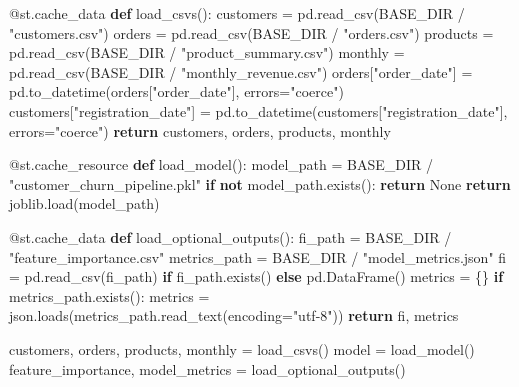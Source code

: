 \documentclass[
  indonesian,
  letterpaper,
  DIV=11,
  numbers=noendperiod]{scrreprt}
\newenvironment{Shaded}{\begin{snugshade}}{\end{snugshade}}
\newcommand{\AttributeTok}[1]{\textcolor[rgb]{0.40,0.45,0.13}{#1}}
\newcommand{\ControlFlowTok}[1]{\textcolor[rgb]{0.00,0.23,0.31}{\textbf{#1}}}
\newcommand{\KeywordTok}[1]{\textcolor[rgb]{0.00,0.23,0.31}{\textbf{#1}}}
\newcommand{\NormalTok}[1]{\textcolor[rgb]{0.00,0.23,0.31}{#1}}
\newcommand{\OperatorTok}[1]{\textcolor[rgb]{0.37,0.37,0.37}{#1}}
\newcommand{\StringTok}[1]{\textcolor[rgb]{0.13,0.47,0.30}{#1}}
\newcommand{\VariableTok}[1]{\textcolor[rgb]{0.07,0.07,0.07}{#1}}
\begin{document}
\begin{Shaded}
\begin{Highlighting}[]
\AttributeTok{@st.cache\_data}
\KeywordTok{def}\NormalTok{ load\_csvs():}
\NormalTok{    customers }\OperatorTok{=}\NormalTok{ pd.read\_csv(BASE\_DIR }\OperatorTok{/} \StringTok{"customers.csv"}\NormalTok{)}
\NormalTok{    orders }\OperatorTok{=}\NormalTok{ pd.read\_csv(BASE\_DIR }\OperatorTok{/} \StringTok{"orders.csv"}\NormalTok{)}
\NormalTok{    products }\OperatorTok{=}\NormalTok{ pd.read\_csv(BASE\_DIR }\OperatorTok{/} \StringTok{"product\_summary.csv"}\NormalTok{)}
\NormalTok{    monthly }\OperatorTok{=}\NormalTok{ pd.read\_csv(BASE\_DIR }\OperatorTok{/} \StringTok{"monthly\_revenue.csv"}\NormalTok{)}
\NormalTok{    orders[}\StringTok{"order\_date"}\NormalTok{] }\OperatorTok{=}\NormalTok{ pd.to\_datetime(orders[}\StringTok{"order\_date"}\NormalTok{], errors}\OperatorTok{=}\StringTok{"coerce"}\NormalTok{)}
\NormalTok{    customers[}\StringTok{"registration\_date"}\NormalTok{] }\OperatorTok{=}\NormalTok{ pd.to\_datetime(customers[}\StringTok{"registration\_date"}\NormalTok{], errors}\OperatorTok{=}\StringTok{"coerce"}\NormalTok{)}
    \ControlFlowTok{return}\NormalTok{ customers, orders, products, monthly}


\AttributeTok{@st.cache\_resource}
\KeywordTok{def}\NormalTok{ load\_model():}
\NormalTok{    model\_path }\OperatorTok{=}\NormalTok{ BASE\_DIR }\OperatorTok{/} \StringTok{"customer\_churn\_pipeline.pkl"}
    \ControlFlowTok{if} \KeywordTok{not}\NormalTok{ model\_path.exists():}
        \ControlFlowTok{return} \VariableTok{None}
    \ControlFlowTok{return}\NormalTok{ joblib.load(model\_path)}


\AttributeTok{@st.cache\_data}
\KeywordTok{def}\NormalTok{ load\_optional\_outputs():}
\NormalTok{    fi\_path }\OperatorTok{=}\NormalTok{ BASE\_DIR }\OperatorTok{/} \StringTok{"feature\_importance.csv"}
\NormalTok{    metrics\_path }\OperatorTok{=}\NormalTok{ BASE\_DIR }\OperatorTok{/} \StringTok{"model\_metrics.json"}
\NormalTok{    fi }\OperatorTok{=}\NormalTok{ pd.read\_csv(fi\_path) }\ControlFlowTok{if}\NormalTok{ fi\_path.exists() }\ControlFlowTok{else}\NormalTok{ pd.DataFrame()}
\NormalTok{    metrics }\OperatorTok{=}\NormalTok{ \{\}}
    \ControlFlowTok{if}\NormalTok{ metrics\_path.exists():}
\NormalTok{        metrics }\OperatorTok{=}\NormalTok{ json.loads(metrics\_path.read\_text(encoding}\OperatorTok{=}\StringTok{"utf{-}8"}\NormalTok{))}
    \ControlFlowTok{return}\NormalTok{ fi, metrics}


\NormalTok{customers, orders, products, monthly }\OperatorTok{=}\NormalTok{ load\_csvs()}
\NormalTok{model }\OperatorTok{=}\NormalTok{ load\_model()}
\NormalTok{feature\_importance, model\_metrics }\OperatorTok{=}\NormalTok{ load\_optional\_outputs()}


\end{Highlighting}
\end{Shaded}
\end{document}
